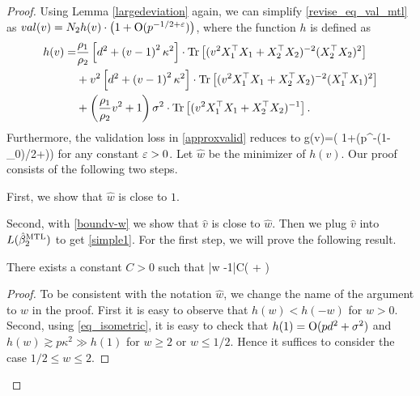 \begin{proof}
	Using Lemma \ref{largedeviation} again, we can simplify \eqref{revise_eq_val_mtl} as $val(v)= N_2h(v) \cdot  \left( 1+\operatorname{O}(p^{-1/2+{\varepsilon}})\right)$, where the function $ h$ is defined as
	\begin{align}
		h(v) =& \frac{\rho_1}{\rho_2}\left[d^2 +\left( v-1\right)^2\kappa^2\right]\cdot \operatorname{Tr}\left[( v^2X_1^{\top}X_1 +X_2^{\top}X_2)^{-2} (X_2^{\top}X_2)^2\right] \nonumber \\
		& +  v^2\left[d^2 +\left( v-1\right)^2\kappa^2\right]\cdot \operatorname{Tr}\left[( v^2X_1^{\top}X_1 +X_2^{\top}X_2)^{-2} (X_1^{\top}X_1)^2\right] \nonumber\\
		& + \left(\frac{\rho_1}{\rho_2} v^2 + 1\right)\sigma^2 \cdot \operatorname{Tr}\left[(v^2X_1^{\top}X_1  + X_2^{\top}X_2)^{-1} \right]. \nonumber
	\end{align}
	Furthermore, the validation loss in \eqref{approxvalid} reduces to
	\be\label{boundv-w}
		g(v)=\cdot \left( 1+\OO(p^{-(1-\e_0)/2+\e})\right)\quad {}
	\ee
	for any constant ${\varepsilon}>0$. %
Let $\hat w$ be the minimizer of $h(v)$. Our proof consists of the following two steps.
\squishlist
	\item First, we show that $\hat{w}$ is close to $1$.
	\item Second, with \eqref{boundv-w} we show that $\hat v$ is close to $\hat w$. Then we plug $\hat{v}$ into $L(\hat{\beta}_2^{\text{MTL}})$ to get \eqref{simple1}.
\squishend
For the first step, we will prove the following result.
\begin{claim}\label{lem_hat_v}
There exists a constant $C>0$ such that
	\be\label{hatw_add1}|\hat w -1|\le C\left( + \right)\quad {}\ee
\end{claim}
\begin{proof}
To be consistent with the notation $\hat w$, we change the name of the argument to $w$ in the proof. First it is easy to observe that $h(w)< h(-w)$ for $w> 0$. Second, using \eqref{eq_isometric}, it is easy to check that $h(1)=\operatorname{O}(pd^2 + \sigma^2)$ and $ h(w)\gtrsim p\kappa^2 \gg h(1)$ for $w\ge 2$ or $w\le 1/2$.  Hence it suffices to consider the case $1/2\le w\le 2$.


\end{proof}
\end{proof}
